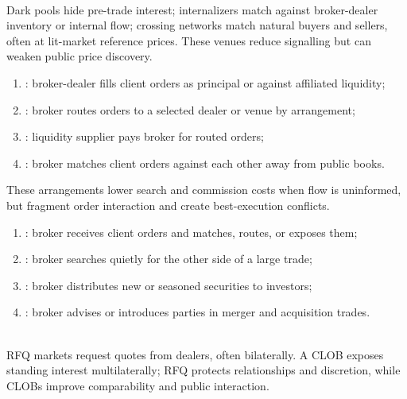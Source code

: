 \begin{taxonomy} \\
Dark pools hide pre-trade interest; internalizers match against broker-dealer inventory or internal flow; crossing networks match natural buyers and sellers, often at lit-market reference prices. These venues reduce signalling but can weaken public price discovery.
\end{taxonomy}

\begin{taxonomy} 
\begin{enumerate}[label=\roman*.]
\setlength{\itemsep}{0pt}
\item {}: broker-dealer fills client orders as principal or against affiliated liquidity;
\item {}: broker routes orders to a selected dealer or venue by arrangement;
\item {}: liquidity supplier pays broker for routed orders;
\item {}: broker matches client orders against each other away from public books.
\end{enumerate}
These arrangements lower search and commission costs when flow is uninformed, but fragment order interaction and create best-execution conflicts.
\end{taxonomy}

\begin{taxonomy} 
\begin{enumerate}[label=\roman*.]
\setlength{\itemsep}{0pt}
\item {}: broker receives client orders and matches, routes, or exposes them;
\item {}: broker searches quietly for the other side of a large trade;
\item {}: broker distributes new or seasoned securities to investors;
\item {}: broker advises or introduces parties in merger and acquisition trades.
\end{enumerate}
\end{taxonomy}

\begin{taxonomy} \\
RFQ markets request quotes from dealers, often bilaterally. A CLOB exposes standing interest multilaterally; RFQ protects relationships and discretion, while CLOBs improve comparability and public interaction.
\end{taxonomy}

